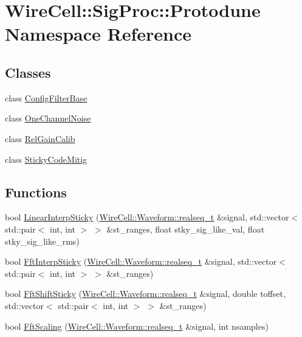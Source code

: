 \hypertarget{namespace_wire_cell_1_1_sig_proc_1_1_protodune}{}\section{Wire\+Cell\+:\+:Sig\+Proc\+:\+:Protodune Namespace Reference}
\label{namespace_wire_cell_1_1_sig_proc_1_1_protodune}
\subsection*{Classes}
\begin{DoxyCompactItemize}
\item 
class \hyperlink{class_wire_cell_1_1_sig_proc_1_1_protodune_1_1_config_filter_base}{Config\+Filter\+Base}
\item 
class \hyperlink{class_wire_cell_1_1_sig_proc_1_1_protodune_1_1_one_channel_noise}{One\+Channel\+Noise}
\item 
class \hyperlink{class_wire_cell_1_1_sig_proc_1_1_protodune_1_1_rel_gain_calib}{Rel\+Gain\+Calib}
\item 
class \hyperlink{class_wire_cell_1_1_sig_proc_1_1_protodune_1_1_sticky_code_mitig}{Sticky\+Code\+Mitig}
\end{DoxyCompactItemize}
\subsection*{Functions}
\begin{DoxyCompactItemize}
\item 
bool \hyperlink{namespace_wire_cell_1_1_sig_proc_1_1_protodune_afc41e8e05bb63814539ac2f89360c0de}{Linear\+Interp\+Sticky} (\hyperlink{namespace_wire_cell_1_1_waveform_a479175e541c8545e87cd8063b74b6956}{Wire\+Cell\+::\+Waveform\+::realseq\+\_\+t} \&signal, std\+::vector$<$ std\+::pair$<$ int, int $>$ $>$ \&st\+\_\+ranges, float stky\+\_\+sig\+\_\+like\+\_\+val, float stky\+\_\+sig\+\_\+like\+\_\+rms)
\item 
bool \hyperlink{namespace_wire_cell_1_1_sig_proc_1_1_protodune_a7bc8b6b7f87df0120589d4a2a0a77c4e}{Fft\+Interp\+Sticky} (\hyperlink{namespace_wire_cell_1_1_waveform_a479175e541c8545e87cd8063b74b6956}{Wire\+Cell\+::\+Waveform\+::realseq\+\_\+t} \&signal, std\+::vector$<$ std\+::pair$<$ int, int $>$ $>$ \&st\+\_\+ranges)
\item 
bool \hyperlink{namespace_wire_cell_1_1_sig_proc_1_1_protodune_a4a864612af01dc605e073a79fc261940}{Fft\+Shift\+Sticky} (\hyperlink{namespace_wire_cell_1_1_waveform_a479175e541c8545e87cd8063b74b6956}{Wire\+Cell\+::\+Waveform\+::realseq\+\_\+t} \&signal, double toffset, std\+::vector$<$ std\+::pair$<$ int, int $>$ $>$ \&st\+\_\+ranges)
\item 
bool \hyperlink{namespace_wire_cell_1_1_sig_proc_1_1_protodune_a70a419137440aaee4a7afd4366c10404}{Fft\+Scaling} (\hyperlink{namespace_wire_cell_1_1_waveform_a479175e541c8545e87cd8063b74b6956}{Wire\+Cell\+::\+Waveform\+::realseq\+\_\+t} \&signal, int nsamples)
\end{DoxyCompactItemize}


